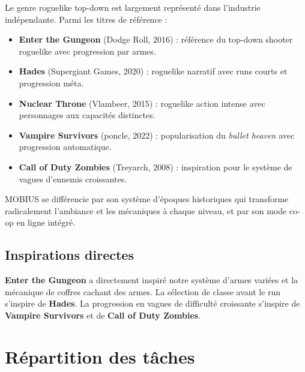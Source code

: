 \documentclass[12pt, a4paper]{report}
\begin{document}
Le genre roguelike top-down est largement repr\'{e}sent\'{e} dans l'industrie ind\'{e}pendante. Parmi les titres de r\'{e}f\'{e}rence :

\begin{itemize}[noitemsep]
  \item \textbf{Enter the Gungeon} (Dodge Roll, 2016) : r\'{e}f\'{e}rence du top-down shooter roguelike avec progression par armes.
  \item \textbf{Hades} (Supergiant Games, 2020) : roguelike narratif avec runs courts et progression m\'{e}ta.
  \item \textbf{Nuclear Throne} (Vlambeer, 2015) : roguelike action intense avec personnages aux capacit\'{e}s distinctes.
  \item \textbf{Vampire Survivors} (poncle, 2022) : popularisation du \textit{bullet heaven} avec progression automatique.
  \item \textbf{Call of Duty Zombies} (Treyarch, 2008) : inspiration pour le syst\`{e}me de vagues d'ennemis croissantes.
\end{itemize}

MOBIUS se diff\'{e}rencie par son syst\`{e}me d'\'{e}poques historiques qui transforme radicalement l'ambiance et les m\'{e}caniques \`{a} chaque niveau, et par son mode co-op en ligne int\'{e}gr\'{e}.

\subsection{Inspirations directes}

\textbf{Enter the Gungeon} a directement inspir\'{e} notre syst\`{e}me d'armes vari\'{e}es et la m\'{e}canique de coffres cachant des armes. La s\'{e}lection de classe avant le run s'inspire de \textbf{Hades}. La progression en vagues de difficult\'{e} croissante s'inspire de \textbf{Vampire Survivors} et de \textbf{Call of Duty Zombies}.

\section{R\'{e}partition des t\^{a}ches}
\end{document}
